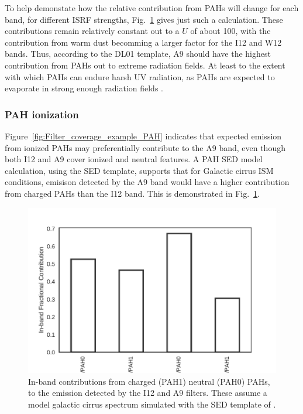          To help demonstate how the relative contribution from PAHs will change for each band, for different ISRF strengths, Fig.~\ref{fig:InBandFracContribution_PAH} gives just such a calculation. These contributions remain relatively constant out to a $U$ of about 100, with the contribution from warm dust becomming a larger factor for the I12 and W12 bands. Thus, according to the DL01 template, A9 should have the highest contribution from PAHs out to extreme radiation fields. At least to the extent with which PAHs can endure harsh UV radiation, as PAHs are expected to evaporate in strong enough radiation fields \citep{allain96a,allain96b,bocchio12,pilleri12, pavlyuchenkov13}.

      \subsubsection{PAH ionization}
        Figure~\ref{fig:Filter_coverage_example_PAH} indicates that expected emission from ionized PAHs may preferentially contribute to the A9 band, even though both I12 and A9 cover ionized and neutral features. A PAH SED model calculation, using the \cite{dustem11} SED template, supports that for Galactic cirrus ISM conditions, emisison detected by the A9 band would have a higher contribution from charged PAHs than the I12 band. This is demonstrated in Fig.~\ref{fig:InBandFracContribution_PAH}.
          \begin{figure}
              \centering
              \includegraphics[width=\textwidth]{../Plots/ch_datasources/InBandFracContribution_PAH.pdf}
              \caption{In-band contributions from charged (PAH1) neutral (PAH0) PAHs, to the emission detected by the I12 and A9 filters. These assume a model galactic cirrus spectrum simulated with the SED template of \cite{dustem11}. }
              \label{fig:InBandFracContribution_PAH}
          \end{figure}
